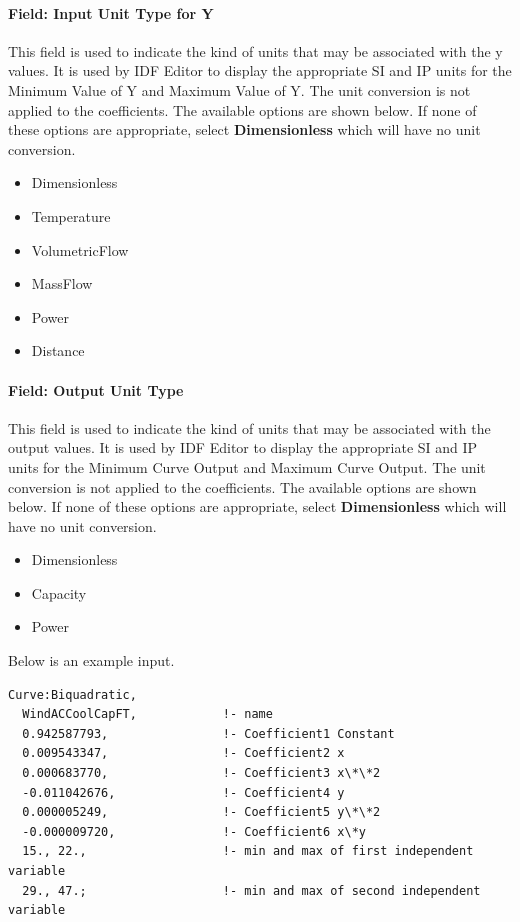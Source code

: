 \paragraph{Field: Input Unit Type for Y}\label{field-input-unit-type-for-y-2}

This field is used to indicate the kind of units that may be associated with the y values. It is used by IDF Editor to display the appropriate SI and IP units for the Minimum Value of Y and Maximum Value of Y. The unit conversion is not applied to the coefficients. The available options are shown below. If none of these options are appropriate, select \textbf{Dimensionless} which will have no unit conversion.

\begin{itemize}
\item
  Dimensionless
\item
  Temperature
\item
  VolumetricFlow
\item
  MassFlow
\item
  Power
\item
  Distance
\end{itemize}

\paragraph{Field: Output Unit Type}\label{field-output-unit-type-6}

This field is used to indicate the kind of units that may be associated with the output values. It is used by IDF Editor to display the appropriate SI and IP units for the Minimum Curve Output and Maximum Curve Output. The unit conversion is not applied to the coefficients. The available options are shown below. If none of these options are appropriate, select \textbf{Dimensionless} which will have no unit conversion.

\begin{itemize}
\item
  Dimensionless
\item
  Capacity
\item
  Power
\end{itemize}

Below is an example input.

\begin{lstlisting}
Curve:Biquadratic,
  WindACCoolCapFT,            !- name
  0.942587793,                !- Coefficient1 Constant
  0.009543347,                !- Coefficient2 x
  0.000683770,                !- Coefficient3 x\*\*2
  -0.011042676,               !- Coefficient4 y
  0.000005249,                !- Coefficient5 y\*\*2
  -0.000009720,               !- Coefficient6 x\*y
  15., 22.,                   !- min and max of first independent variable
  29., 47.;                   !- min and max of second independent variable
\end{lstlisting}

